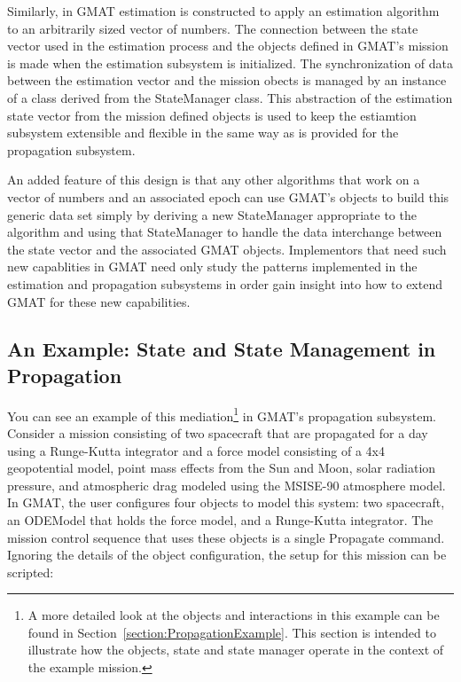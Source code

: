 Similarly, in GMAT estimation is constructed to apply an estimation algorithm to an arbitrarily
sized vector of numbers.  The connection between the state vector used in the estimation process and
the objects defined in GMAT's mission is made when the estimation subsystem is initialized.  The
synchronization of data between the estimation vector and the mission obects is managed by an
instance of a class derived from the StateManager class.  This abstraction of the estimation state
vector from the mission defined objects is used to keep the estiamtion subsystem extensible and
flexible in the same way as is provided for the propagation subsystem.

An added feature of this design is that any other algorithms that work on a vector of numbers
and an associated epoch can use GMAT's objects to build this generic data set simply by deriving a
new StateManager appropriate to the algorithm and using that StateManager to handle the data
interchange between the state vector and the associated GMAT objects.  Implementors that need such
new capablities in GMAT need only study the patterns implemented in the estimation and propagation
subsystems in order gain insight into how to extend GMAT for these new capabilities.

\subsection[A Propagation State Example]{An Example: State and State Management in Propagation}

You can see an example of this mediation\footnote{A more detailed look at the objects and
interactions in this example can be found in Section~\ref{section:PropagationExample}.  This
section is intended to illustrate how the objects, state and state manager operate in the context
of the example mission.} in GMAT's propagation subsystem. Consider a mission consisting of two
spacecraft that are propagated for a day using a Runge-Kutta integrator and a force model consisting
of a 4x4 geopotential model, point mass effects from the Sun and Moon, solar radiation pressure, and
atmospheric drag modeled using the MSISE-90 atmosphere model.  In GMAT, the user configures four
objects to model this system: two spacecraft, an ODEModel that holds the force model, and a
Runge-Kutta integrator.  The mission control sequence that uses these objects is a single Propagate
command.  Ignoring the details of the object configuration, the setup for this mission can be
scripted:

